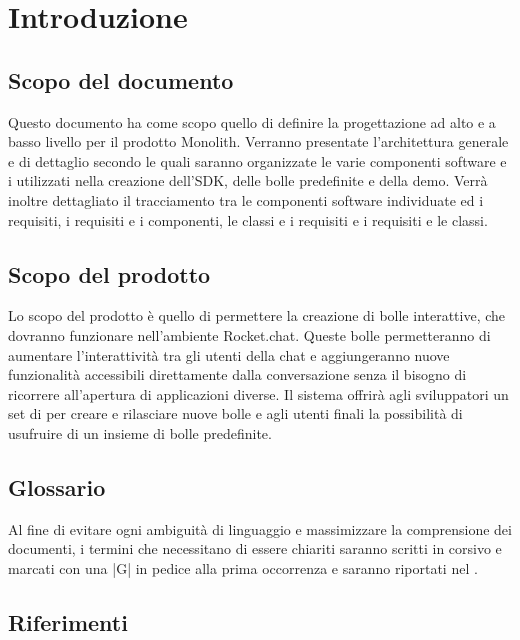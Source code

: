 
\section{Introduzione}
\subsection{Scopo del documento}

Questo documento ha come scopo quello di definire la progettazione ad
alto  e a basso livello
per il prodotto Monolith. Verranno presentate l'architettura generale e
di dettaglio secondo le quali
saranno organizzate le varie componenti software e i  utilizzati nella
creazione dell'SDK, delle bolle predefinite e della demo. Verrà
inoltre dettagliato il tracciamento tra le componenti software
individuate ed i requisiti, i requisiti e i componenti, le classi e i
requisiti e i requisiti e le classi.


\subsection{Scopo del prodotto}

Lo scopo del prodotto è quello di permettere la creazione di bolle
interattive, che dovranno funzionare nell'ambiente Rocket.chat. Queste
bolle permetteranno di aumentare l'interattività tra gli utenti della
chat e aggiungeranno nuove funzionalità accessibili direttamente dalla conversazione 
senza il bisogno di ricorrere all'apertura di applicazioni diverse.
Il sistema offrirà agli sviluppatori un set di  per creare e
rilasciare nuove bolle e agli utenti finali la possibilità di
usufruire di un insieme di bolle predefinite.


\subsection{Glossario}

Al fine di evitare ogni ambiguità di linguaggio e massimizzare la
comprensione dei documenti, i termini che necessitano di essere
chiariti saranno scritti in corsivo e marcati con una |G| in pedice alla prima
occorrenza e saranno riportati nel \gloss.

\subsection{Riferimenti}


